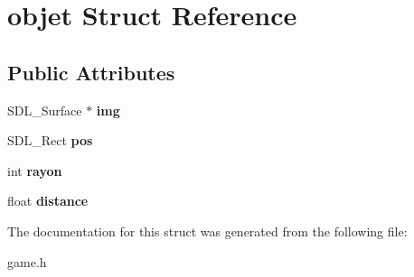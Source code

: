 \hypertarget{structobjet}{}\section{objet Struct Reference}
\label{structobjet}
\subsection*{Public Attributes}
\begin{DoxyCompactItemize}
\item 
\mbox{\label{structobjet_a39afc4992481df9872875a246aa12917}} 
S\+D\+L\+\_\+\+Surface $\ast$ {\bfseries img}
\item 
\mbox{\label{structobjet_ac535cf8230f3eeef6eb24adb51870eac}} 
S\+D\+L\+\_\+\+Rect {\bfseries pos}
\item 
\mbox{\label{structobjet_a64195a8e4857ff45524da01a7f003d36}} 
int {\bfseries rayon}
\item 
\mbox{\label{structobjet_a57bc01791bf1d521fb66d031db001e59}} 
float {\bfseries distance}
\end{DoxyCompactItemize}


The documentation for this struct was generated from the following file\+:\begin{DoxyCompactItemize}
\item 
game.\+h\end{DoxyCompactItemize}
